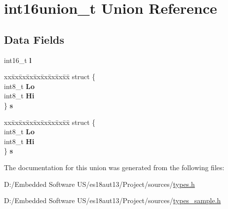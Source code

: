 \hypertarget{unionint16union__t}{}\section{int16union\+\_\+t Union Reference}
\label{unionint16union__t}
\subsection*{Data Fields}
\begin{DoxyCompactItemize}
\item 
\hypertarget{unionint16union__t_ad8a9524a204892ae3d42a2d251ea0643}{}int16\+\_\+t {\bfseries l}\label{unionint16union__t_ad8a9524a204892ae3d42a2d251ea0643}

\item 
\hypertarget{unionint16union__t_ac0210a36f83b3154e025e7873bac9a4d}{}\begin{tabbing}
xx\=xx\=xx\=xx\=xx\=xx\=xx\=xx\=xx\=\kill
struct \{\\
\>int8\_t {\bfseries Lo}\\
\>int8\_t {\bfseries Hi}\\
\} {\bfseries s}\label{unionint16union__t_ac0210a36f83b3154e025e7873bac9a4d}
\\

\end{tabbing}\item 
\hypertarget{unionint16union__t_a546f7a6f2d3fa1a5fdb5ac685c0efbc1}{}\begin{tabbing}
xx\=xx\=xx\=xx\=xx\=xx\=xx\=xx\=xx\=\kill
struct \{\\
\>int8\_t {\bfseries Lo}\\
\>int8\_t {\bfseries Hi}\\
\} {\bfseries s}\label{unionint16union__t_a546f7a6f2d3fa1a5fdb5ac685c0efbc1}
\\

\end{tabbing}\end{DoxyCompactItemize}


The documentation for this union was generated from the following files\+:\begin{DoxyCompactItemize}
\item 
D\+:/\+Embedded Software U\+S/es18aut13/\+Project/sources/\hyperlink{types_8h}{types.\+h}\item 
D\+:/\+Embedded Software U\+S/es18aut13/\+Project/sources/\hyperlink{types__sample_8h}{types\+\_\+sample.\+h}\end{DoxyCompactItemize}
